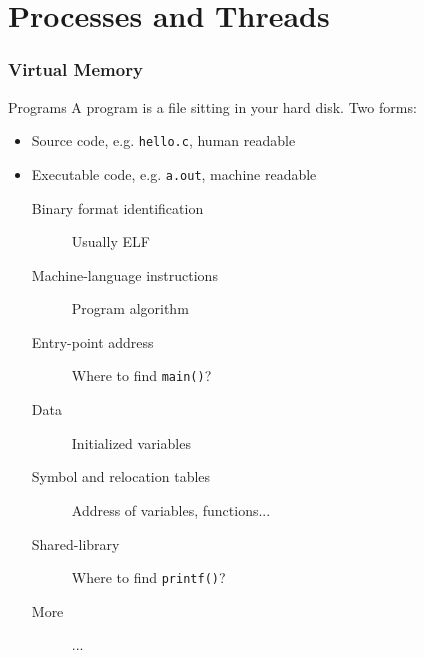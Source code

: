 \mode*
\part{Processes and Threads}

\section{Virtual Memory}
\label{sec:virtual-memory}

\begin{frame}{Programs}
A program is a file sitting in your hard disk. Two forms:
\begin{itemize}
\item Source code, e.g. \texttt{hello.c}, human readable
\item Executable code, e.g. \texttt{a.out}, machine readable
  \begin{description}
  \item[Binary format identification] Usually ELF
  \item[Machine-language instructions] Program algorithm
  \item[Entry-point address] Where to find \texttt{main()}?
  \item[Data] Initialized variables
  \item[Symbol and relocation tables] Address of variables, functions...
  \item[Shared-library] Where to find \texttt{printf()}?
  \item[More] ...
  \end{description}
\end{itemize}
\end{frame}

